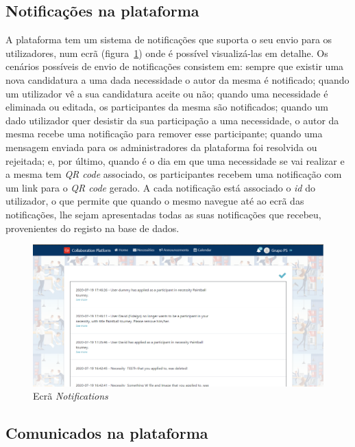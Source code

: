 \subsection{Notificações na plataforma}\label{subsec:implementacao:notificacoes}

A plataforma tem um sistema de notificações que suporta o seu envio para os utilizadores, num ecrã (figura~\ref{fig:notifications}) onde é possível visualizá-las em detalhe. 
Os cenários possíveis de envio de notificações consistem em: sempre que existir uma nova candidatura a uma dada necessidade o autor da mesma é notificado; 
quando um utilizador vê a sua candidatura aceite ou não; 
quando uma necessidade é eliminada ou editada, os participantes da mesma são notificados;
quando um dado utilizador quer desistir da sua participação a uma necessidade, o autor da mesma recebe uma notificação para remover esse participante;
quando uma mensagem enviada para os administradores da plataforma foi resolvida ou rejeitada;
e, por último, quando é o dia em que uma necessidade se vai realizar e a mesma tem \textit{QR code} associado, os participantes recebem uma notificação com um link para o \textit{QR code} gerado.
A cada notificação está associado o \textit{id} do utilizador, o que permite que quando o mesmo navegue até ao ecrã das notificações, 
lhe sejam apresentadas todas as suas notificações que recebeu, provenientes do registo na base de dados.

\begin{figure}[H]
  \centering 
  \includegraphics[scale=0.4]{figures/Notifications.png}
  \caption{Ecrã \textit{Notifications}}\label{fig:notifications}
\end{figure}


\subsection{Comunicados na plataforma}\label{subsec:implementacao:comunicados}

